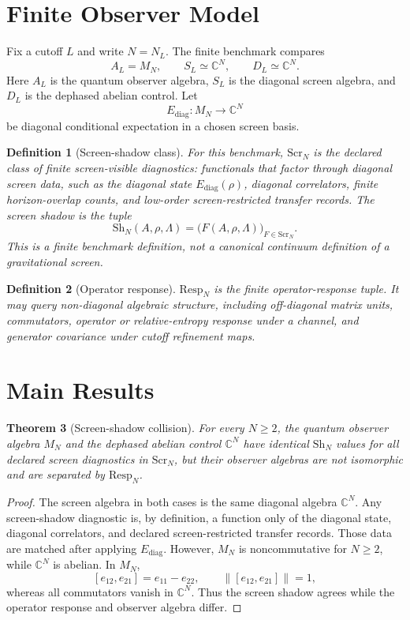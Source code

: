 \documentclass[11pt]{article}
\newtheorem{theorem}{Theorem}
\newtheorem{definition}[theorem]{Definition}
\newcommand{\Sh}{\mathrm{Sh}}
\newcommand{\Resp}{\mathrm{Resp}}
\begin{document}
\section{Finite Observer Model}

Fix a cutoff $L$ and write $N=N_L$. The finite benchmark compares
\[
  A_L=M_N,\qquad S_L\simeq \mathbb{C}^N,\qquad D_L\simeq \mathbb{C}^N.
\]
Here $A_L$ is the quantum observer algebra, $S_L$ is the diagonal screen
algebra, and $D_L$ is the dephased abelian control. Let
\[
  E_{\mathrm{diag}}:M_N\to\mathbb{C}^N
\]
be diagonal conditional expectation in a chosen screen basis.

\begin{definition}[Screen-shadow class]
For this benchmark, $\mathrm{Scr}_N$ is the declared class of finite
screen-visible diagnostics: functionals that factor through diagonal screen
data, such as the diagonal state $E_{\mathrm{diag}}(\rho)$, diagonal
correlators, finite horizon-overlap counts, and low-order screen-restricted
transfer records. The screen shadow is the tuple
\[
  \Sh_N(A,\rho,\Lambda)=
  \bigl(F(A,\rho,\Lambda)\bigr)_{F\in \mathrm{Scr}_N}.
\]
This is a finite benchmark definition, not a canonical continuum definition of
a gravitational screen.
\end{definition}

\begin{definition}[Operator response]
$\Resp_N$ is the finite operator-response tuple. It may query non-diagonal
algebraic structure, including off-diagonal matrix units, commutators,
operator or relative-entropy response under a channel, and generator
covariance under cutoff refinement maps.
\end{definition}

\section{Main Results}

\begin{theorem}[Screen-shadow collision]
For every $N\ge 2$, the quantum observer algebra $M_N$ and the dephased
abelian control $\mathbb{C}^N$ have identical $\Sh_N$ values for all declared
screen diagnostics in $\mathrm{Scr}_N$, but their observer algebras are not
isomorphic and are separated by $\Resp_N$.
\end{theorem}

\begin{proof}
The screen algebra in both cases is the same diagonal algebra
$\mathbb{C}^N$. Any screen-shadow diagnostic is, by definition, a function
only of the diagonal state, diagonal correlators, and declared
screen-restricted transfer records. Those data are matched after applying
$E_{\mathrm{diag}}$. However, $M_N$ is noncommutative for $N\ge2$, while
$\mathbb{C}^N$ is abelian. In $M_N$,
\[
  [e_{12},e_{21}]=e_{11}-e_{22},
  \qquad \|[e_{12},e_{21}]\|=1,
\]
whereas all commutators vanish in $\mathbb{C}^N$. Thus the screen shadow
agrees while the operator response and observer algebra differ.
\end{proof}
\end{document}
